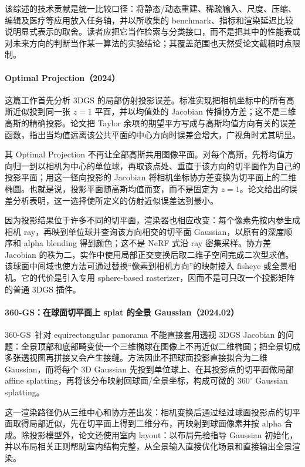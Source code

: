 该综述的技术贡献是统一比较口径：将静态/动态重建、稀疏输入、尺度、压缩、编辑及医疗等应用放入任务轴，并以所收集的 benchmark、指标和渲染延迟比较说明显式表示的取舍。读者应把它当作检索与分类接口，而不是把其中的性能表或对未来方向的判断当作某一算法的实验结论；其覆盖范围也天然受论文截稿时点限制。


\paragraph{Optimal Projection（2024）\cite{2402_00752}}
这篇工作首先分析 3DGS 的局部仿射投影误差。标准实现把相机坐标中的所有高斯近似投到同一张 $z=1$ 平面，并以均值处的 Jacobian 传播协方差；这不是三维高斯的精确投影。论文把 Taylor 余项的期望平方写成与高斯均值方向有关的误差函数，指出当均值远离该公共平面的中心方向时误差会增大，广视角时尤其明显。

其 Optimal Projection 不再让全部高斯共用图像平面。对每个高斯，先将均值方向归一到以相机为中心的单位球，再取该点处、垂直于该方向的切平面作为自己的投影平面；用这一径向投影的 Jacobian 将相机坐标协方差变换为切平面上的二维椭圆。也就是说，投影平面随高斯均值而变，而不是固定为 $z=1$。论文给出的误差分析表明，这一选择使所定义的仿射近似误差达到最小。

因为投影结果位于许多不同的切平面，渲染器也相应改变：每个像素先按内参生成相机 ray，再映到单位球并查询该方向相交的切平面 Gaussian，以原有的深度顺序和 alpha blending 得到颜色；这不是 NeRF 式沿 ray 密集采样。协方差 Jacobian 的秩为二，实作中使用局部正交变换后取二维子空间完成二次型求值。该球面中间域也使方法可通过替换“像素到相机方向”的映射接入 fisheye 或全景相机。它的代价是引入专用 sphere-based rasterizer，因而不是可只改一个投影矩阵的普通 3DGS 插件。

\paragraph{360-GS：在球面切平面上 splat 的全景 Gaussian（2024.02）}
360-GS~\cite{2402_00763}针对 equirectangular panorama 不能直接套用透视 3DGS Jacobian 的问题：全景顶部和底部畸变使一个三维椭球在图像上不再近似二维椭圆；把全景切成多张透视图再拼接又会产生接缝。方法因此不把球面投影直接拟合为二维 Gaussian，而将每个 3D Gaussian 先投到单位球上、在其投影点的切平面做局部 affine splatting，再将该分布映射回球面/全景坐标，构成可微的 $360^\circ$ Gaussian splatting。

这一渲染路径仍从三维中心和协方差出发：相机变换后通过经过球面投影点的切平面取得局部近似，先在切平面上得到二维分布，再映射到球面像素并按 alpha 合成。除投影模型外，论文还使用室内 layout：以布局先验指导 Gaussian 初始化，并以布局相关正则帮助室内结构完整，从全景输入直接优化场景和直接输出全景渲染。

